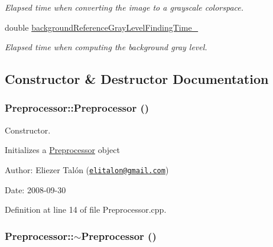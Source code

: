 \begin{CompactItemize}
\begin{CompactList}\small\item\em Elapsed time when converting the image to a grayscale colorspace. \item\end{CompactList}\item 
\hypertarget{class_preprocessor_140ea3fa7bbd4e8fef54912d65c4e926}{
double \hyperlink{class_preprocessor_140ea3fa7bbd4e8fef54912d65c4e926}{backgroundReferenceGrayLevelFindingTime\_\-}}
\label{class_preprocessor_140ea3fa7bbd4e8fef54912d65c4e926}

\begin{CompactList}\small\item\em Elapsed time when computing the background gray level. \item\end{CompactList}\end{CompactItemize}


\subsection{Constructor \& Destructor Documentation}
\hypertarget{class_preprocessor_da966c8b83e7c3bcd8759549c3cdf688}{
\subsubsection[Preprocessor]{\setlength{\rightskip}{0pt plus 5cm}Preprocessor::Preprocessor ()}}
\label{class_preprocessor_da966c8b83e7c3bcd8759549c3cdf688}


Constructor. 

Initializes a \hyperlink{class_preprocessor}{Preprocessor} object

\begin{Desc}
\item[Author:]Eliezer Talón (\href{mailto:elitalon@gmail.com}{\tt elitalon@gmail.com}) \end{Desc}
\begin{Desc}
\item[Date:]2008-09-30 \end{Desc}


Definition at line 14 of file Preprocessor.cpp.\hypertarget{class_preprocessor_3c16724bc9e18b12a45f5a7fe2752b1b}{
\subsubsection[$\sim$Preprocessor]{\setlength{\rightskip}{0pt plus 5cm}Preprocessor::$\sim$Preprocessor ()}}
\label{class_preprocessor_3c16724bc9e18b12a45f5a7fe2752b1b}


